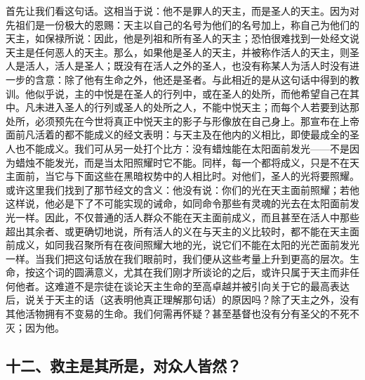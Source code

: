 首先让我们看这句话。这相当于说：他不是罪人的天主，而是圣人的天主。因为对先祖们是一份极大的恩赐：天主以自己的名号为他们的名号加上，称自己为他们的天主，如保禄所说：因此，他是列祖和所有圣人的天主；恐怕很难找到一处经文说天主是任何恶人的天主。那么，如果他是圣人的天主，并被称作活人的天主，则圣人是活人，活人是圣人；既没有在活人之外的圣人，也没有称某人为活人时没有进一步的含意：除了他有生命之外，他还是圣者。与此相近的是从这句话中得到的教训。他似乎说，主的中悦是在圣人的行列中，或在圣人的处所，而他希望自己在其中。凡未进入圣人的行列或圣人的处所之人，不能中悦天主；而每个人若要到达那处所，必须预先在今世将真正中悦天主的影子与形像放在自己身上。那宣布在上帝面前凡活着的都不能成义的经文表明：与天主及在他内的义相比，即使最成全的圣人也不能成义。我们可从另一处打个比方：没有蜡烛能在太阳面前发光——不是因为蜡烛不能发光，而是当太阳照耀时它不能。同样，每一个都将成义，只是不在天主面前，当它与下面这些在黑暗权势中的人相比时。对他们，圣人的光将要照耀。或许这里我们找到了那节经文的含义：他没有说：你们的光在天主面前照耀；若他这样说，他必是下了不可能实现的诫命，如同命令那些有灵魂的光去在太阳面前发光一样。因此，不仅普通的活人群众不能在天主面前成义，而且甚至在活人中那些超出其余者、或更确切地说，所有活人的义在与天主的义比较时，都不能在天主面前成义，如同我召聚所有在夜间照耀大地的光，说它们不能在太阳的光芒面前发光一样。当我们把这句话放在我们眼前时，我们便从这些考量上升到更高的层次。生命，按这个词的圆满意义，尤其在我们刚才所谈论的之后，或许只属于天主而非任何他者。这难道不是宗徒在谈论天主生命的至高卓越并被引向关于它的最高表达后，说关于天主的话（这表明他真正理解那句话）的原因吗？除了天主之外，没有其他活物拥有不变易的生命。我们何需再怀疑？甚至基督也没有分有圣父的不死不灭；因为他。\par


\subsection{十二、救主是其所是，对众人皆然？}

